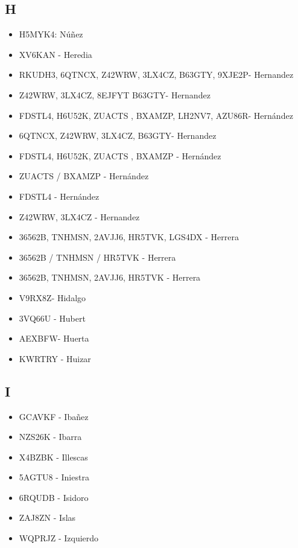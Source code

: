 \subsection*{H}
\begin{itemize}[leftmargin=*,nosep]
\item H5MYK4: Núñez
\item XV6KAN - Heredia
\item RKUDH3, 6QTNCX, Z42WRW, 3LX4CZ, B63GTY, 9XJE2P- Hernandez
\item Z42WRW, 3LX4CZ, 8EJFYT B63GTY- Hernandez
\item FDSTL4, H6U52K, ZUACTS , BXAMZP, LH2NV7, AZU86R- Hernández
\item 6QTNCX, Z42WRW, 3LX4CZ, B63GTY- Hernandez
\item FDSTL4, H6U52K, ZUACTS , BXAMZP - Hernández
\item ZUACTS / BXAMZP -  Hernández
\item FDSTL4 - Hernández
\item Z42WRW, 3LX4CZ  -  Hernandez
\item 36562B, TNHMSN, 2AVJJ6, HR5TVK, LGS4DX - Herrera
\item 36562B / TNHMSN / HR5TVK - Herrera
\item 36562B, TNHMSN, 2AVJJ6, HR5TVK - Herrera
\item V9RX8Z- Hidalgo
\item 3VQ66U - Hubert
\item AEXBFW- Huerta
\item KWRTRY - Huizar
\end{itemize}

\subsection*{I}
\begin{itemize}[leftmargin=*,nosep]
\item GCAVKF - Ibañez
\item NZS26K  -  Ibarra
\item X4BZBK - Illescas
\item 5AGTU8 - Iniestra
\item 6RQUDB - Isidoro
\item ZAJ8ZN - Islas
\item WQPRJZ - Izquierdo
\end{itemize}

